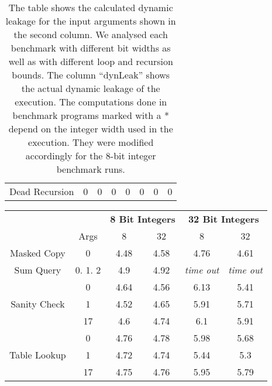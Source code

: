 \begin{table}[]
{\begin{tabular}{cc|ccc|ccc}
Dead Recursion                     & 0       & 0              & 0           & 0           & 0                                           & 0        & 0       
\end{tabular}
}
\caption{The table shows the calculated dynamic leakage for the input arguments shown in the second column. We analysed each benchmark with different bit widths as well as with different loop and recursion bounds. The column \enquote{dynLeak} shows the actual dynamic leakage of the execution. The computations done in benchmark programs marked with a * depend on the integer width used in the execution. They were modified accordingly for the 8-bit integer benchmark runs.}\label{tab:dLeak}
\end{table}


\begin{table}[]
\centering
\begin{tabular}{cc|cc|cc}
                                   &         & \multicolumn{2}{c}{\textbf{8 Bit Integers}} & \multicolumn{2}{c}{\textbf{32 Bit Integers}}   \\
                                   & Args    & 8                & 32              & 8                 & 32                \\\hline\hline
Masked Copy                        & 0       & 4.48             & 4.58            & 4.76              & 4.61              \\\hline
Sum Query                          & 0. 1. 2 & 4.9              & 4.92            & \textit{time out} & \textit{time out} \\\hline
\multirow{3}{*}{Sanity Check}      & 0       & 4.64             & 4.56            & 6.13              & 5.41              \\
                                   & 1       & 4.52             & 4.65            & 5.91              & 5.71              \\
                                   & 17      & 4.6              & 4.74            & 6.1               & 5.91              \\\hline
\multirow{3}{*}{Table Lookup}      & 0       & 4.76             & 4.78            & 5.98              & 5.68              \\
                                   & 1       & 4.72             & 4.74            & 5.44              & 5.3               \\
                                   & 17      & 4.75             & 4.76            & 5.95              & 5.79              \\\hline

\end{tabular}
\end{table}
